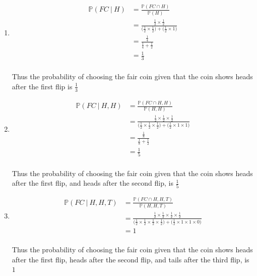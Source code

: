 \documentclass[a4paper]{article}
\newcommand{\p}{\mathbb{P}}
\newcommand{\ds}{\displaystyle}
\begin{document}
\begin{enumerate}
	\pagebreak
		
	\begin{enumerate}

		\item 
		\begin{align*}
			\p(FC\:|\:H) & = \frac{\p(FC \cap H)}{\p(H)} \\
			& = \frac{\frac{1}{2}\times\frac{1}{2}}{\Big(\frac{1}{2}\times\frac{1}{2} \Big) + \Big(\frac{1}{2}\times1\Big)} \\
			& = \frac{\frac{1}{4}}{\frac{1}{4} + \frac{1}{2}} \\
			& = \frac{1}{3} \\
		\end{align*}

		Thus the probability of choosing the fair coin given that the coin shows heads after the first flip is $\ds{\frac{1}{3}}$

		\bigbreak

		\item
		\begin{align*}
			\p(FC\:|\:H,H) & = \frac{\p(FC \cap H,H)}{\p(H,H)} \\
			& = \frac{\frac{1}{2}\times\frac{1}{2}\times\frac{1}{2}}{\Big(\frac{1}{2}\times\frac{1}{2}\times\frac{1}{2}\Big) + \Big(\frac{1}{2}\times1\times1\Big)} \\
			& = \frac{\frac{1}{8}}{\frac{1}{8} + \frac{1}{2}} \\
			& = \frac{1}{5} \\
		\end{align*}

		Thus the probability of choosing the fair coin given that the coin shows heads after the first flip, and heads after the second flip, is $\ds{\frac{1}{5}}$

		\bigbreak
		
		\item
		\begin{align*}
			\p(FC\:|\:H,H,T) & = \frac{\p(FC \cap H,H,T)}{\p(H,H,T)} \\
			& = \frac{\frac{1}{2}\times\frac{1}{2}\times\frac{1}{2}\times\frac{1}{2}}{\Big(\frac{1}{2}\times\frac{1}{2}\times\frac{1}{2}\times\frac{1}{2}\Big) + \Big(\frac{1}{2}\times1\times1\times0\Big)} \\
			& = 1 \\
		\end{align*}

		Thus the probability of choosing the fair coin given that the coin shows heads after the first flip, heads after the second flip, and tails after the third flip, is $\ds{1}$


\end{enumerate}
\end{enumerate}
\end{document}
